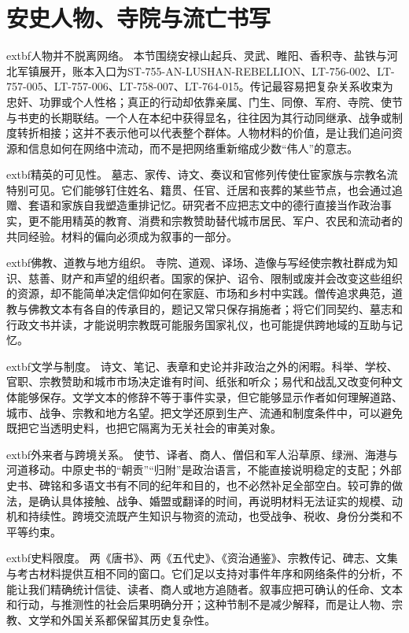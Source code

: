\section{安史人物、寺院与流亡书写}
\label{sec:an-shi-biographies-monasteries}

\noindent	extbf{人物并不脱离网络。} 本节围绕安禄山起兵、灵武、睢阳、香积寺、盐铁与河北军镇展开，账本入口为ST-755-AN-LUSHAN-REBELLION、LT-756-002、LT-757-005、LT-757-006、LT-758-007、LT-764-015。传记最容易把复杂关系收束为忠奸、功罪或个人性格；真正的行动却依靠亲属、门生、同僚、军府、寺院、使节与书吏的长期联结。一个人在本纪中获得显名，往往因为其行动同继承、战争或制度转折相接；这并不表示他可以代表整个群体。人物材料的价值，是让我们追问资源和信息如何在网络中流动，而不是把网络重新缩成少数“伟人”的意志。

\noindent	extbf{精英的可见性。} 墓志、家传、诗文、奏议和官修列传使仕宦家族与宗教名流特别可见。它们能够钉住姓名、籍贯、任官、迁居和丧葬的某些节点，也会通过追赠、套语和家族自我塑造重排记忆。研究者不应把志文中的德行直接当作政治事实，更不能用精英的教育、消费和宗教赞助替代城市居民、军户、农民和流动者的共同经验。材料的偏向必须成为叙事的一部分。

\noindent	extbf{佛教、道教与地方组织。} 寺院、道观、译场、造像与写经使宗教社群成为知识、慈善、财产和声望的组织者。国家的保护、诏令、限制或废并会改变这些组织的资源，却不能简单决定信仰如何在家庭、市场和乡村中实践。僧传追求典范，道教与佛教文本有各自的传承目的，题记又常只保存捐施者；将它们同契约、墓志和行政文书并读，才能说明宗教既可能服务国家礼仪，也可能提供跨地域的互助与记忆。

\noindent	extbf{文学与制度。} 诗文、笔记、表章和史论并非政治之外的闲暇。科举、学校、官职、宗教赞助和城市市场决定谁有时间、纸张和听众；易代和战乱又改变何种文体能够保存。文学文本的修辞不等于事件实录，但它能够显示作者如何理解道路、城市、战争、宗教和地方名望。把文学还原到生产、流通和制度条件中，可以避免既把它当透明史料，也把它隔离为无关社会的审美对象。

\noindent	extbf{外来者与跨境关系。} 使节、译者、商人、僧侣和军人沿草原、绿洲、海港与河道移动。中原史书的“朝贡”“归附”是政治语言，不能直接说明稳定的支配；外部史书、碑铭和多语文书有不同的纪年和目的，也不必然补足全部空白。较可靠的做法，是确认具体接触、战争、婚盟或翻译的时间，再说明材料无法证实的规模、动机和持续性。跨境交流既产生知识与物资的流动，也受战争、税收、身份分类和不平等约束。

\noindent	extbf{史料限度。} 两《唐书》、两《五代史》、《资治通鉴》、宗教传记、碑志、文集与考古材料提供互相不同的窗口。它们足以支持对事件年序和网络条件的分析，不能让我们精确统计信徒、读者、商人或地方追随者。叙事应把可确认的任命、文本和行动，与推测性的社会后果明确分开；这种节制不是减少解释，而是让人物、宗教、文学和外国关系都保留其历史复杂性。

